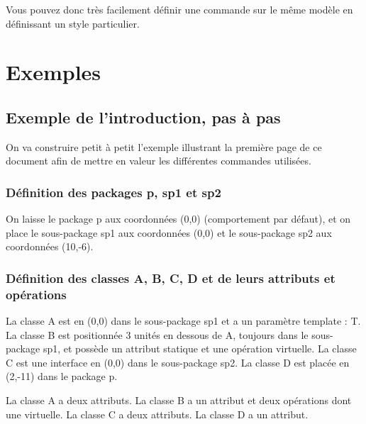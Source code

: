 \documentclass[a4paper,11pt]{report}
\newcommand{\inputTikZ}[1]{%
  }%
\newcommand{\inputTikZ}[1]{%
    \texttt{[image: fig/\#1.pdf]}%
  }%
\begin{document}
Vous pouvez donc très facilement définir une commande sur le même modèle en définissant un style particulier.

\section{Exemples}

\subsection{Exemple de l'introduction, pas à pas}

On va construire petit à petit l'exemple illustrant la première page de ce document afin de mettre en valeur les différentes commandes utilisées.

\subsubsection{Définition des packages p, sp1 et sp2}

On laisse le package p aux coordonnées (0,0) (comportement par défaut), et on place le sous-package sp1 aux coordonnées (0,0) et le sous-package sp2 aux coordonnées (10,-6).

{\color{red!70!black}
\vspace{-0.4cm}
\vspace{-0.4cm}
\vspace{-0.4cm}

}

\begin{center}
\inputTikZ{figure32}
\end{center}

\subsubsection{Définition des classes A, B, C, D et de leurs attributs et opérations}

La classe A est en (0,0) dans le sous-package sp1 et a un paramètre template : T. La classe B est positionnée 3 unités en dessous de A, toujours dans le sous-package sp1, et  possède un attribut statique et une opération virtuelle. La classe C est une interface en (0,0) dans le sous-package sp2. La classe D est placée en (2,-11) dans le package p.

La classe A a deux attributs. La classe B a un attribut et deux opérations dont une virtuelle. La classe C a deux attributs. La classe D a un attribut.
\end{document}
